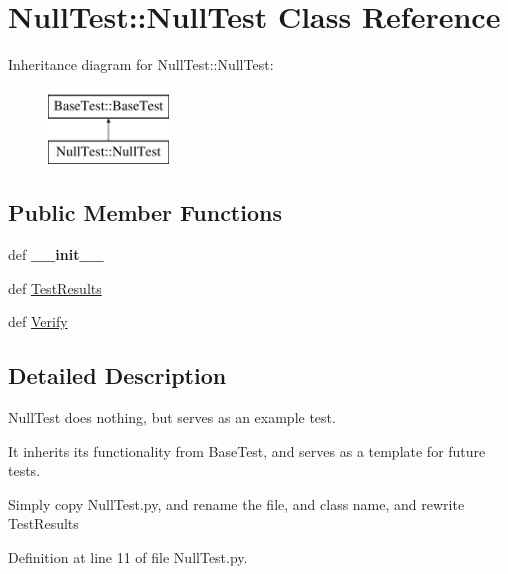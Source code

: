 \hypertarget{classNullTest_1_1NullTest}{
\section{NullTest::NullTest Class Reference}
\label{classNullTest_1_1NullTest}
}
Inheritance diagram for NullTest::NullTest:\begin{figure}[H]
\begin{center}
\leavevmode
\includegraphics[height=2.000000cm]{classNullTest_1_1NullTest}
\end{center}
\end{figure}
\subsection*{Public Member Functions}
\begin{DoxyCompactItemize}
\item 
\hypertarget{classNullTest_1_1NullTest_ad0d8edee8b2eefb82e1bd0a5cc70baea}{
def {\bfseries \_\-\_\-init\_\-\_\-}}
\label{classNullTest_1_1NullTest_ad0d8edee8b2eefb82e1bd0a5cc70baea}

\item 
def \hyperlink{classNullTest_1_1NullTest_a7e6be14efc9b8191860c5d6bd62f0088}{TestResults}
\item 
def \hyperlink{classNullTest_1_1NullTest_a129b504762a05e76a355e6ef482ac8ab}{Verify}
\end{DoxyCompactItemize}


\subsection{Detailed Description}
\begin{DoxyVerb}NullTest does nothing, but serves as an example test.

    It inherits its functionality from BaseTest, and serves as a template for future
tests.  

Simply copy NullTest.py, and rename the file, and class name, and rewrite TestResults
\end{DoxyVerb}
 

Definition at line 11 of file NullTest.py.




